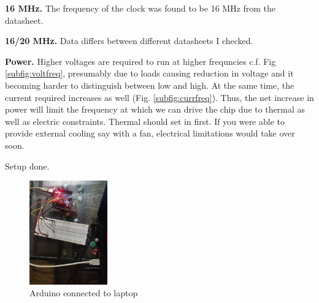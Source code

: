 
\begin{arabicparts}
    \questionpart
    \textbf{16 MHz.} The frequency of the clock was found to
    be 16 MHz from the datasheet. 

    \questionpart
    \textbf{16/20 MHz.} Data differs between different datasheets
    I checked. 

    \questionpart
    \textbf{Power.} Higher voltages are required to run at higher frequncies c.f. Fig \ref{subfig:voltfreq},
    presumably due to loads causing reduction in voltage and it becoming 
    harder to distinguish between low and high. At the same time, the current
    required increases as well (Fig. \ref{subfig:currfreq}). Thus, the net increase 
    in power will limit the frequency at which we can drive the chip due to thermal
    as well as electric constraints. Thermal should set in first. If you were able
    to provide external cooling say with a fan, electrical limitations would take over 
    soon.

    \questionpart
    Setup done.

    \begin{figure}[ht]
        \centering
        \includegraphics[width=0.3\textwidth]{fig/arduinoconnected-min.jpg}
        \caption{Arduino connected to laptop}
        \label{fig:arduinoconnected}
    \end{figure}



\end{arabicparts}
